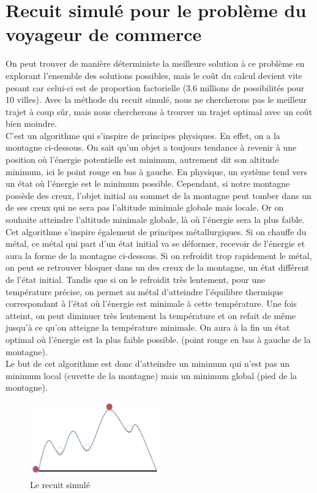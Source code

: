 \documentclass{article}
\begin{document}
\section{Recuit simulé pour le problème du voyageur de commerce}
On peut trouver de manière déterministe la meilleure solution à ce problème en explorant l’ensemble des solutions possibles, mais le coût du calcul devient vite pesant car celui-ci est de proportion factorielle (3.6 millions de possibilités pour 10 villes). Avec la méthode du recuit simulé, nous ne chercherons pas le meilleur trajet à coup sûr, mais nous chercherons à trouver un trajet optimal avec un coût bien moindre.\\
C’est un algorithme qui s’inspire de principes physiques. En effet, on a la montagne ci-dessous. On sait qu’un objet a toujours tendance à revenir à une position où l’énergie potentielle est minimum, autrement dit son altitude minimum, ici le point rouge en bas à gauche. En physique, un système tend vers un état où l’énergie est le minimum possible. Cependant, si notre montagne possède des creux, l’objet initial au sommet de la montagne peut tomber dans un de ses creux qui ne sera pas l’altitude minimale globale mais locale. Or on souhaite atteindre l’altitude minimale globale, là où l’énergie sera la plus faible.\\
 Cet algorithme s’inspire également de principes métallurgiques. Si on chauffe du métal, ce métal qui part d’un état initial va se déformer, recevoir de l’énergie et aura la forme de la montagne ci-dessous. Si on refroidit trop rapidement le métal, on peut se retrouver bloquer dans un des creux de la montagne, un état différent de l’état initial. Tandis que si on le refroidit très lentement, pour une température précise, on permet au métal d’atteindre l’équilibre thermique correspondant à l’état où l’énergie est minimale à cette température. Une fois atteint, on peut diminuer très lentement la température et on refait de même jusqu’à ce qu’on atteigne la température minimale. On aura à la fin un état optimal où l’énergie est la plus faible possible. (point rouge en bas à gauche de la montagne).\\
Le but de cet algorithme est donc d’atteindre un minimum qui n’est pas un minimum local (cuvette de la montagne) mais un minimum global (pied de la montagne).\\
\begin{figure}[h]\centering
\includegraphics[width=0.5\textwidth]{rcd}
\caption{Le recuit simulé}
\end{figure}\\
\end{document}
